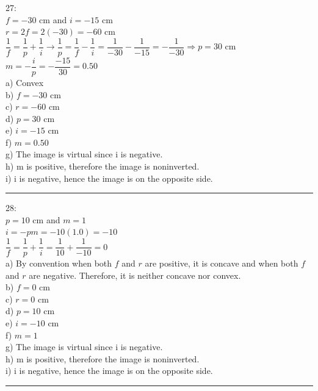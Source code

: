 \documentclass[fleqn]{article}
\begin{document}
\begin{enumerate}
    \textcolor{hwColor}{
      27: \\
      $f=-30$ cm and $i=-15$ cm \\
      $r=2f=2(-30)=-60$ cm \\
      $\dfrac{1}{f}=\dfrac{1}{p}+\dfrac{1}{i} \rightarrow \dfrac{1}{p}=\dfrac{1}{f}-\dfrac{1}{i}=\dfrac{1}{-30}-\dfrac{1}{-15}=-\dfrac{1}{-30} \Longrightarrow p=30$ cm \\
      $m=-\dfrac{i}{p}=-\dfrac{-15}{30}=0.50$ \\
      a) Convex \\
      b) $f=-30$ cm \\
      c) $r=-60$ cm \\
      d) $p=30$ cm \\
      e) $i=-15$ cm \\
      f) $m=0.50$ \\
      g) The image is virtual since i is negative. \\
      h) m is positive, therefore the image is noninverted. \\
      i) i is negative, hence the image is on the opposite side. \\
    }

    \textcolor{hwColor}{
      \rule{15cm}{0.4pt}
    }

    \textcolor{hwColor}{
      28: \\
      $p=10$ cm and $m=1$ \\
      $i=-pm=-10(1.0)=-10$ \\
      $\dfrac{1}{f}=\dfrac{1}{p}+\dfrac{1}{i}=\dfrac{1}{10}+\dfrac{1}{-10}=0$ \\
      a) By convention when both $f$ and $r$ are positive, it is concave and when both $f$ and $r$ are negative. Therefore, it is neither concave nor convex.  \\
      b) $f=0$ cm \\
      c) $r=0$ cm \\
      d) $p=10$ cm \\
      e) $i=-10$ cm \\
      f) $m=1$ \\
      g) The image is virtual since i is negative. \\
      h) m is positive, therefore the image is noninverted. \\
      i) i is negative, hence the image is on the opposite side. \\
    }

    \textcolor{hwColor}{
      \rule{15cm}{0.4pt}
    }


\end{enumerate}
\end{document}
